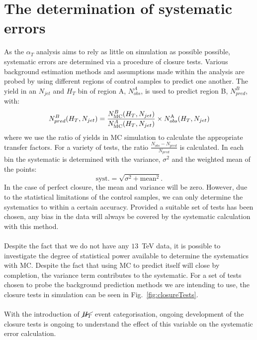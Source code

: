 
\section{The determination of systematic errors}
\label{sec:closureTests}

As the $\alpha_T$ analysis aims to rely as little on simulation as possible possible, systematic errors are determined via a procedure of closure tests. Various background estimation methods and assumptions made within the analysis are probed by using different regions of control samples to predict one another. The yield in an $N_{jet}$ and $H_T$ bin of region A, $N_{obs}^A$, is used to predict region B, $N_{pred}^B$, with:
\begin{equation}
  N_{pred}^B(H_T,N_{jet}) = \frac{N_{\rm MC}^
      B(H_T,N_{jet})}{N_{\rm MC}^A(H_T,N_{jet})} \times 
      N_{obs}^{\rm A}(H_T,N_{jet})   
\end{equation}
where we use the ratio of yields in MC simulation to calculate the appropriate transfer factors. For a variety of tests, the ratio $\frac{N_{obs}-N_{pred}}{N_{pred}}$ is calculated. In each bin the systematic is determined with the variance, $\sigma^2$ and the weighted mean of the points: 
\begin{equation}
\textrm{syst.} = \sqrt{\sigma^2+\textrm{mean}^2}.
\end{equation}
In the case of perfect closure, the mean and variance will be zero. However, due to the statistical limitations of the control samples, we can only determine the systematics to within a certain accuracy. Provided a suitable set of tests has been chosen, any bias in the data will always be covered by the systematic calculation with this method.
\\\\
Despite the fact that we do not have any $13$~TeV data, it is possible to investigate the degree of statistical power available to determine the systematics with MC. Despite the fact that using MC to predict itself will close by completion, the variance term contributes to the systematic. For a set of tests chosen to probe the background prediction methods we are intending to use, the closure tests in simulation can be seen in Fig.~\ref{fig:closureTests}.
\\\\
With the introduction of $\cancel{H_T}$ event categorisation, ongoing development of the closure tests is ongoing to understand the effect of this variable on the systematic error calculation.

